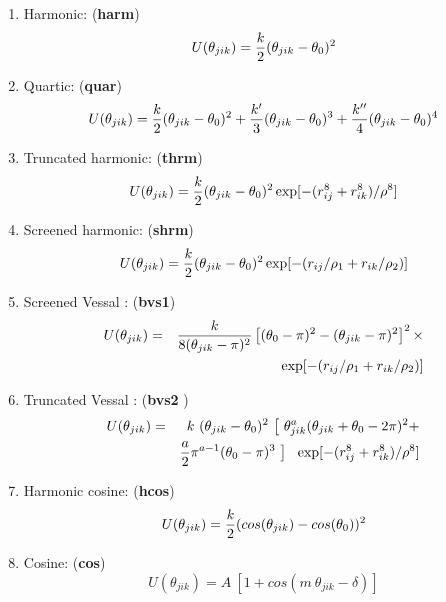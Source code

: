 \begin{enumerate}
\item Harmonic:  ({\bf harm})
\begin{equation}
 U(\theta_{jik}) = {k \over 2} (\theta_{jik} - \theta_0)^{2}
\end{equation}
\item Quartic:  ({\bf quar})
\begin{equation}
 U(\theta_{jik}) = {k \over 2}(\theta_{jik} - \theta_0)^{2} + {k' \over
3}(\theta_{jik} - \theta_0)^{3} + {k'' \over 4}(\theta_{jik} -
\theta_0)^{4}
\end{equation}
\item Truncated harmonic:  ({\bf thrm})
\begin{equation}
U(\theta_{jik}) = {k\over 2} (\theta_{jik} - \theta_0)^{2}
\exp[-(r_{ij}^{8} + r_{ik}^{8}) / \rho^{8}]
\end{equation}
\item Screened harmonic:  ({\bf shrm})
\begin{equation}
 U(\theta_{jik}) = {k\over 2} (\theta_{jik} - \theta_0)^{2}
\exp[-(r_{ij} / \rho_1 + r_{ik} / \rho_2)]
\end{equation}
\item Screened Vessal \cite{vessal-94a}:  ({\bf bvs1})
\begin{eqnarray}
U(\theta_{jik})&=&{k \over 8(\theta_{jik}-\pi)^{2}} \left[ (\theta_0
-\pi)^{2} -(\theta_{jik}-\pi)^{2}\right]^{2} \times \nonumber \\
              & &  \exp[-(r_{ij} / \rho_1 + r_{ik} / \rho_2)]
\end{eqnarray}
\item Truncated Vessal \cite{smith-95a}:  ({\bf bvs2 })
\begin{eqnarray}
U(\theta_{jik})&=& k~(\theta_{jik}-\theta_{0})^{2}~
\big[~\theta_{jik}^a (\theta_{jik}+\theta_{0}-2\pi)^{2} + \nonumber \\
& & {a \over 2} \pi^{a-1} (\theta_{0}-\pi)^{3}~\big]~~\exp[-(r_{ij}^{8} + r_{ik}^{8}) / \rho^{8}]
\end{eqnarray}
\item Harmonic cosine:  ({\bf hcos})
\begin{equation}
U(\theta_{jik}) = {k\over 2}(cos(\theta_{jik})
-cos(\theta_{0}))^{2}
\end{equation}
\item Cosine:  ({\bf cos})
\begin{equation}
U(\theta_{jik}) = A~[1 + cos(m~\theta_{jik}-\delta)]
\end{equation}

\end{enumerate}
